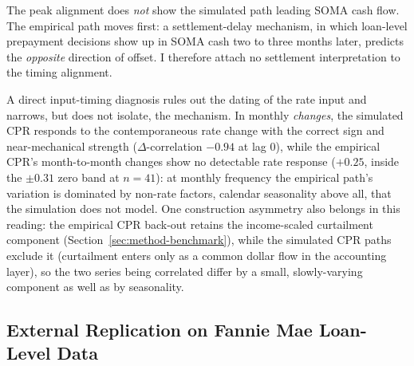 \documentclass[12pt]{article}
\begin{document}
The peak alignment does \emph{not} show the simulated path leading SOMA cash flow. The empirical path moves first: a settlement-delay mechanism, in which loan-level prepayment decisions show up in SOMA cash two to three months later, predicts the \emph{opposite} direction of offset. I therefore attach no settlement interpretation to the timing alignment.

A direct input-timing diagnosis rules out the dating of the rate input and narrows, but does not isolate, the mechanism. In monthly \emph{changes}, the simulated CPR responds to the contemporaneous rate change with the correct sign and near-mechanical strength ($\Delta$-correlation $-0.94$ at lag 0), while the empirical CPR's month-to-month changes show no detectable rate response ($+0.25$, inside the $\pm 0.31$ zero band at $n = 41$): at monthly frequency the empirical path's variation is dominated by non-rate factors, calendar seasonality above all, that the simulation does not model. One construction asymmetry also belongs in this reading: the empirical CPR back-out retains the income-scaled curtailment component (Section~\ref{sec:method-benchmark}), while the simulated CPR paths exclude it (curtailment enters only as a common dollar flow in the accounting layer), so the two series being correlated differ by a small, slowly-varying component as well as by seasonality.

\subsection{External Replication on Fannie Mae Loan-Level Data}\label{sec:pathb-fannie}
\end{document}
